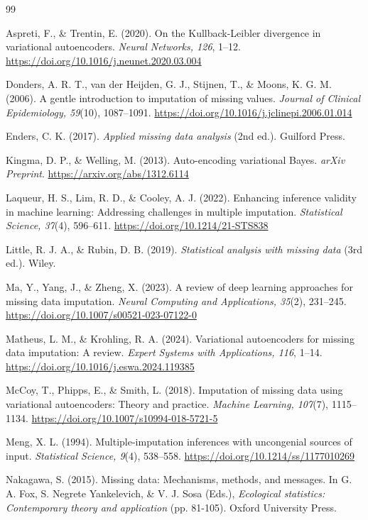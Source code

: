 \documentclass[10pt, a4paper]{article}
\begin{document}
\begin{thebibliography}{99}

 Aspreti, F., \& Trentin, E. (2020). On the Kullback-Leibler divergence in variational autoencoders. \textit{Neural Networks, 126}, 1–12. \url{https://doi.org/10.1016/j.neunet.2020.03.004}

 Donders, A. R. T., van der Heijden, G. J., Stijnen, T., \& Moons, K. G. M. (2006). A gentle introduction to imputation of missing values. \textit{Journal of Clinical Epidemiology, 59}(10), 1087–1091. \url{https://doi.org/10.1016/j.jclinepi.2006.01.014}

 Enders, C. K. (2017). \textit{Applied missing data analysis} (2nd ed.). Guilford Press.

 Kingma, D. P., \& Welling, M. (2013). Auto-encoding variational Bayes. \textit{arXiv Preprint}. \url{https://arxiv.org/abs/1312.6114}

 Laqueur, H. S., Lim, R. D., \& Cooley, A. J. (2022). Enhancing inference validity in machine learning: Addressing challenges in multiple imputation. \textit{Statistical Science, 37}(4), 596–611. \url{https://doi.org/10.1214/21-STS838}

 Little, R. J. A., \& Rubin, D. B. (2019). \textit{Statistical analysis with missing data} (3rd ed.). Wiley.

 Ma, Y., Yang, J., \& Zheng, X. (2023). A review of deep learning approaches for missing data imputation. \textit{Neural Computing and Applications, 35}(2), 231–245. \url{https://doi.org/10.1007/s00521-023-07122-0}

 Matheus, L. M., \& Krohling, R. A. (2024). Variational autoencoders for missing data imputation: A review. \textit{Expert Systems with Applications, 116}, 1–14. \url{https://doi.org/10.1016/j.eswa.2024.119385}

 McCoy, T., Phipps, E., \& Smith, L. (2018). Imputation of missing data using variational autoencoders: Theory and practice. \textit{Machine Learning, 107}(7), 1115–1134. \url{https://doi.org/10.1007/s10994-018-5721-5}

 Meng, X. L. (1994). Multiple-imputation inferences with uncongenial sources of input. \textit{Statistical Science, 9}(4), 538–558. \url{https://doi.org/10.1214/ss/1177010269}

 Nakagawa, S. (2015). Missing data: Mechanisms, methods, and messages. In G. A. Fox, S. Negrete Yankelevich, \& V. J. Sosa (Eds.), \textit{Ecological statistics: Contemporary theory and application} (pp. 81-105). Oxford University Press.


\end{thebibliography}
\end{document}
